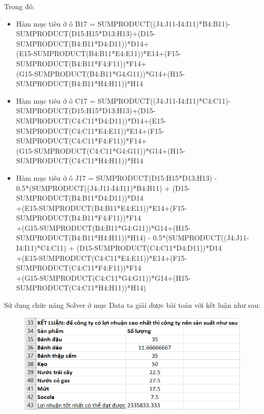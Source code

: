 \documentclass[a4paper]{article}
\begin{document}
        Trong đó:
        \begin{itemize}
            \item Hàm mục tiêu ở ô B17 = SUMPRODUCT((J4:J11-I4:I11)*B4:B11)-\\
            SUMPRODUCT(D15:H15*D13:H13)+(D15-SUMPRODUCT(B4:B11*D4:D11))*D14+\\
            (E15-SUMPRODUCT(B4:B11*E4:E11))*E14+(F15-SUMPRODUCT(B4:B11*F4:F11))*F14+\\
            (G15-SUMPRODUCT(B4:B11*G4:G11))*G14+(H15-SUMPRODUCT(B4:B11*H4:H11))*H14
            \item Hàm mục tiêu ở ô C17 = SUMPRODUCT((J4:J11-I4:I11)*C4:C11)-\\
            SUMPRODUCT(D15:H15*D13:H13)+(D15-SUMPRODUCT(C4:C11*D4:D11))*D14+(E15-SUMPRODUCT(C4:C11*E4:E11))*E14+(F15-SUMPRODUCT(C4:C11*F4:F11))*F14+\\
            (G15-SUMPRODUCT(C4:C11*G4:G11))*G14+(H15-SUMPRODUCT(C4:C11*H4:H11))*H14
            \item Hàm mục tiêu ở ô J17 = SUMPRODUCT(D15:H15*D13:H13) - \\
            0.5*(SUMPRODUCT((J4:J11-I4:I11)*B4:B11) + (D15-SUMPRODUCT(B4:B11*D4:D11))*D14\\
            +(E15-SUMPRODUCT(B4:B11*E4:E11))*E14+(F15-SUMPRODUCT(B4:B11*F4:F11))*F14\\
            +(G15-SUMPRODUCT(B4:B11*G4:G11))*G14+(H15-SUMPRODUCT(B4:B11*H4:H11))*H14) - 0.5*(SUMPRODUCT((J4:J11-I4:I11)*C4:C11) + (D15-SUMPRODUCT(C4:C11*D4:D11))*D14\\
            +(E15-SUMPRODUCT(C4:C11*E4:E11))*E14+(F15-SUMPRODUCT(C4:C11*F4:F11))*F14\\
            +(G15-SUMPRODUCT(C4:C11*G4:G11))*G14+(H15-SUMPRODUCT(C4:C11*H4:H11))*H14)
        \end{itemize}

        Sử dụng chức năng Solver ở mục Data ta giải được bài toán với kết luận như sau:
        \begin{figure}[!ht]
            \centering
            \includegraphics[width=1\linewidth]{tab4.png}
        \end{figure}
\end{document}
